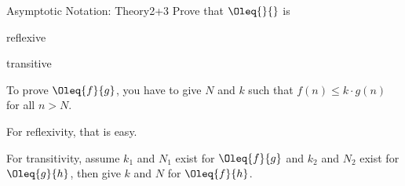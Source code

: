 \documentclass[a4paper]{article}
\begin{document}
\begin{problem}{Asymptotic Notation: Theory}{2+3}
Prove that $\Oleq{}{}$ is
\begin{compactenum}
 \item reflexive
 \item transitive
\end{compactenum}

\begin{hint}
To prove $\Oleq{f}{g}$, you have to give $N$ and $k$ such that $f(n)\leq k\cdot g(n)$ for all $n>N$.

For reflexivity, that is easy.

For transitivity, assume $k_1$ and $N_1$ exist for $\Oleq{f}{g}$ and $k_2$ and $N_2$ exist for $\Oleq{g}{h}$, then give $k$ and $N$ for $\Oleq{f}{h}$.
\end{hint}
\end{problem}
\end{document}
